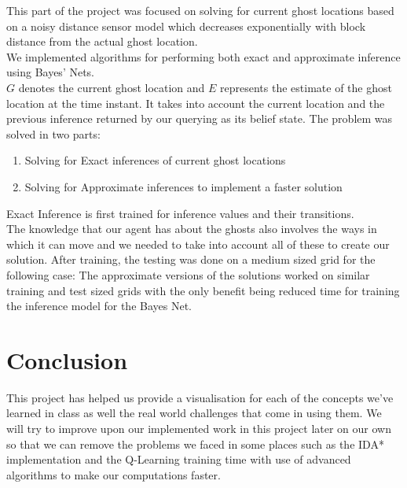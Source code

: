 This part of the project was focused on solving for current ghost locations based on a noisy distance sensor model which decreases exponentially with block distance from the actual ghost location.\\
We implemented algorithms for performing both exact and approximate inference using Bayes' Nets.\\ 
 $G$ denotes the current ghost location and $E$ represents the estimate of the ghost location at the time instant. It takes into account the current location and the previous inference returned by our querying as its belief state.
The problem was solved in two parts:
\begin{enumerate}
\item Solving for Exact inferences of current ghost locations
\item Solving for Approximate inferences to implement a faster solution
\end{enumerate}
Exact Inference is first trained for inference values and their transitions.\\ 
The knowledge that our agent has about the ghosts also involves the ways in which it can move and we needed to take into account all of these to create our solution. After training, the testing was done on a medium sized grid for the following case: 
The approximate versions of the solutions worked on similar training and test sized grids with the only benefit being reduced time for training the inference model for the Bayes Net.

\section{Conclusion}
This project has helped us provide a visualisation for each of the concepts we've learned in class as well the real world challenges that come in using them. We will try to improve upon our implemented work in this project later on our own so that we can remove the problems we faced in some places such as the IDA* implementation and the Q-Learning training time with use of advanced algorithms to make our computations faster.
